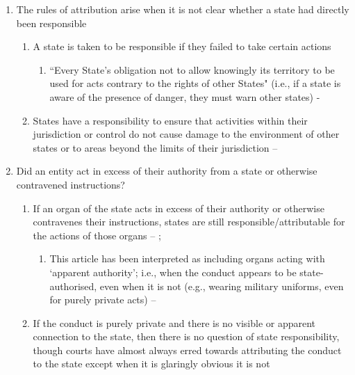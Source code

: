 \begin{enumerate}
\begin{enumerate}
        \item The rules of attribution arise when it is not clear whether a state had directly been responsible
        \begin{enumerate}
            \item A state is taken to be responsible if they failed to take certain actions
            \begin{enumerate}
                \item ``Every State's obligation not to allow knowingly its territory to be used for acts contrary to the rights of other States" (i.e., if a state is aware of the presence of danger, they must warn other states) - 
            \end{enumerate}
            \item States have a responsibility to ensure that activities within their jurisdiction or control do not cause damage to the environment of other states or to areas beyond the limits of their jurisdiction -- 
        \end{enumerate}
        \item Did an entity act in excess of their authority from a state or otherwise contravened instructions?
        \begin{enumerate}
            \item If an organ of the state acts in excess of their authority or otherwise contravenes their instructions, states are still responsible/attributable for the actions of those organs -- ; 
            \begin{enumerate}
                \item This article has been interpreted as including organs acting with `apparent authority'; i.e., when the conduct appears to be state-authorised, even when it is not (e.g., wearing military uniforms, even for purely private acts) -- 
            \end{enumerate}
            \item If the conduct is purely private and there is no visible or apparent connection to the state, then there is no question of state responsibility, though courts have almost always erred towards attributing the conduct to the state except when it is glaringly obvious it is not

\end{enumerate}
\end{enumerate}
\end{enumerate}
